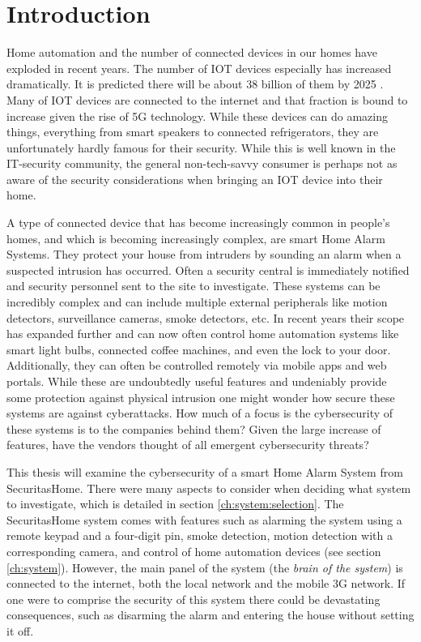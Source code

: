 \chapter{Introduction} \label{ch:intro}
Home automation and the number of connected devices in our homes have exploded in recent years. The number of \gls{IOT} devices especially has increased dramatically. It is predicted there will be about 38 billion of them by 2025 \cite{ieee-iot}. Many of \gls{IOT} devices are connected to the internet and that fraction is bound to increase given the rise of 5G technology. While these devices can do amazing things, everything from smart speakers to connected refrigerators, they are unfortunately hardly famous for their security. While this is well known in the IT-security community, the general non-tech-savvy consumer is perhaps not as aware of the security considerations when bringing an \gls{IOT} device into their home.

A type of connected device that has become increasingly common in people's homes, and which is becoming increasingly complex, are smart Home Alarm Systems. They protect your house from intruders by sounding an alarm when a suspected intrusion has occurred. Often a security central is immediately notified and security personnel sent to the site to investigate. These systems can be incredibly complex and can include multiple external peripherals like motion detectors, surveillance cameras, smoke detectors, etc. In recent years their scope has expanded further and can now often control home automation systems like smart light bulbs, connected coffee machines, and even the lock to your door. Additionally, they can often be controlled remotely via mobile apps and web portals. While these are undoubtedly useful features and undeniably provide some protection against physical intrusion one might wonder how secure these systems are against cyberattacks. How much of a focus is the cybersecurity of these systems is to the companies behind them? Given the large increase of features, have the vendors thought of all emergent cybersecurity threats?

This thesis will examine the cybersecurity of a smart Home Alarm System from SecuritasHome. There were many aspects to consider when deciding what system to investigate, which is detailed in section \ref{ch:system:selection}. The SecuritasHome system comes with features such as alarming the system using a remote keypad and a four-digit pin, smoke detection, motion detection with a corresponding camera, and control of home automation devices (see section \ref{ch:system}). However, the main panel of the system (the \textit{brain of the system}) is connected to the internet, both the local network and the mobile 3G network. If one were to comprise the security of this system there could be devastating consequences, such as disarming the alarm and entering the house without setting it off.

